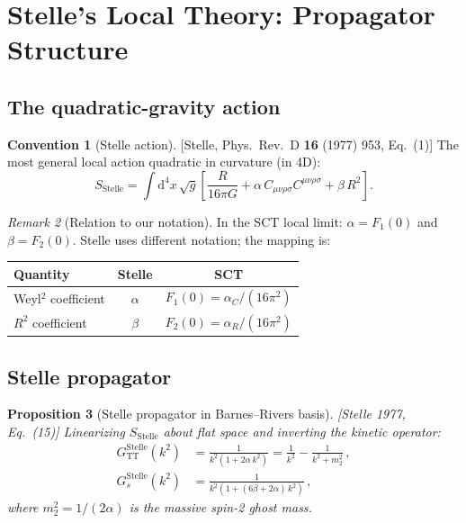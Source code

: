 \documentclass[12pt,a4paper]{article}
\newtheorem{proposition}{Proposition}[section]
\theoremstyle{definition}
\newtheorem{convention}[proposition]{Convention}
\theoremstyle{remark}
\newtheorem{remark}[proposition]{Remark}
\newcommand{\Weylsq}{C_{\mu\nu\rho\sigma}C^{\mu\nu\rho\sigma}}
\newcommand{\dd}{\mathrm{d}}
\newcommand{\fromlit}[1]{\textcolor{blue!70!black}{\textsf{[#1]}}}
\begin{document}
\section{Stelle's Local Theory: Propagator Structure}
\label{sec:stelle}

\subsection{The quadratic-gravity action}

\begin{convention}[Stelle action]
\label{conv:stelle-action}
\fromlit{Stelle, Phys.\ Rev.\ D \textbf{16} (1977) 953, Eq.~(1)}
The most general local action quadratic in curvature (in 4D):
\begin{equation}
  S_{\text{Stelle}} = \int\dd^4x\,\sqrt{g}\left[
    \frac{R}{16\pi G}
    + \alpha\,\Weylsq + \beta\,R^2
  \right].
  \label{eq:stelle-action}
\end{equation}
\end{convention}

\begin{remark}[Relation to our notation]
In the SCT local limit: $\alpha = F_1(0)$ and $\beta = F_2(0)$.
Stelle uses different notation; the mapping is:
\begin{center}
\begin{tabular}{lcc}
\toprule
Quantity & Stelle & SCT \\
\midrule
Weyl$^2$ coefficient & $\alpha$ & $F_1(0) = \alpha_C/(16\pi^2)$ \\
$R^2$ coefficient & $\beta$ & $F_2(0) = \alpha_R/(16\pi^2)$ \\
\bottomrule
\end{tabular}
\end{center}
\end{remark}


\subsection{Stelle propagator}

\begin{proposition}[Stelle propagator in Barnes--Rivers basis]
\label{prop:stelle-propagator}
\fromlit{Stelle 1977, Eq.~(15)}
Linearizing $S_{\text{Stelle}}$ about flat space and inverting
the kinetic operator:
\begin{align}
  G^{\text{Stelle}}_{\text{TT}}(k^2)
  &= \frac{1}{k^2(1 + 2\alpha\, k^2)}
  = \frac{1}{k^2} - \frac{1}{k^2 + m_2^2}\,,
  \label{eq:stelle-prop-tt}\\[4pt]
  G^{\text{Stelle}}_s(k^2)
  &= \frac{1}{k^2(1 + (6\beta + 2\alpha)\, k^2)}\,,
  \label{eq:stelle-prop-s}
\end{align}
where $m_2^2 = 1/(2\alpha)$ is the massive spin-2 ghost mass.
\end{proposition}
\end{document}
